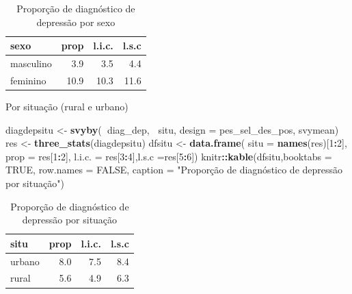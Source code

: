 \documentclass[]{book}
\newenvironment{Shaded}{\begin{snugshade}}{\end{snugshade}}
\newcommand{\KeywordTok}[1]{\textcolor[rgb]{0.13,0.29,0.53}{\textbf{#1}}}
\newcommand{\DataTypeTok}[1]{\textcolor[rgb]{0.13,0.29,0.53}{#1}}
\newcommand{\DecValTok}[1]{\textcolor[rgb]{0.00,0.00,0.81}{#1}}
\newcommand{\StringTok}[1]{\textcolor[rgb]{0.31,0.60,0.02}{#1}}
\newcommand{\OtherTok}[1]{\textcolor[rgb]{0.56,0.35,0.01}{#1}}
\newcommand{\OperatorTok}[1]{\textcolor[rgb]{0.81,0.36,0.00}{\textbf{#1}}}
\newcommand{\NormalTok}[1]{#1}
\theoremstyle{definition}
\theoremstyle{definition}
\theoremstyle{definition}
\theoremstyle{remark}
\begin{document}
\begin{table}

\caption{\label{tab:unnamed-chunk-46}Proporção de diagnóstico de depressão por sexo}
\centering
\begin{tabular}[t]{lrrr}
\toprule
sexo & prop & l.i.c. & l.s.c\\
\midrule
masculino & 3.9 & 3.5 & 4.4\\
feminino & 10.9 & 10.3 & 11.6\\
\bottomrule
\end{tabular}
\end{table}

Por situação (rural e urbano)

\begin{Shaded}
\begin{Highlighting}[]
\NormalTok{diagdepsitu <-}\StringTok{ }\KeywordTok{svyby}\NormalTok{(}\OperatorTok{~}\NormalTok{diag_dep, }\OperatorTok{~}\NormalTok{situ, }\DataTypeTok{design =}\NormalTok{ pes_sel_des_pos, }
\NormalTok{  svymean)}
\NormalTok{res <-}\StringTok{ }\KeywordTok{three_stats}\NormalTok{(diagdepsitu)}
\NormalTok{dfsitu <-}\StringTok{ }\KeywordTok{data.frame}\NormalTok{( }\DataTypeTok{situ =} \KeywordTok{names}\NormalTok{(res)[}\DecValTok{1}\OperatorTok{:}\DecValTok{2}\NormalTok{], }\DataTypeTok{prop =}\NormalTok{ res[}\DecValTok{1}\OperatorTok{:}\DecValTok{2}\NormalTok{], }\DataTypeTok{l.i.c. =}\NormalTok{ res[}\DecValTok{3}\OperatorTok{:}\DecValTok{4}\NormalTok{],}\DataTypeTok{l.s.c =}\NormalTok{res[}\DecValTok{5}\OperatorTok{:}\DecValTok{6}\NormalTok{])}
\NormalTok{knitr}\OperatorTok{::}\KeywordTok{kable}\NormalTok{(dfsitu,}\DataTypeTok{booktabs =} \OtherTok{TRUE}\NormalTok{, }\DataTypeTok{row.names =} \OtherTok{FALSE}\NormalTok{, }
\DataTypeTok{caption =} \StringTok{"Proporção de diagnóstico de depressão por situação"}\NormalTok{)}
\end{Highlighting}
\end{Shaded}

\begin{table}

\caption{\label{tab:unnamed-chunk-47}Proporção de diagnóstico de depressão por situação}
\centering
\begin{tabular}[t]{lrrr}
\toprule
situ & prop & l.i.c. & l.s.c\\
\midrule
urbano & 8.0 & 7.5 & 8.4\\
rural & 5.6 & 4.9 & 6.3\\
\bottomrule
\end{tabular}
\end{table}
\end{document}
